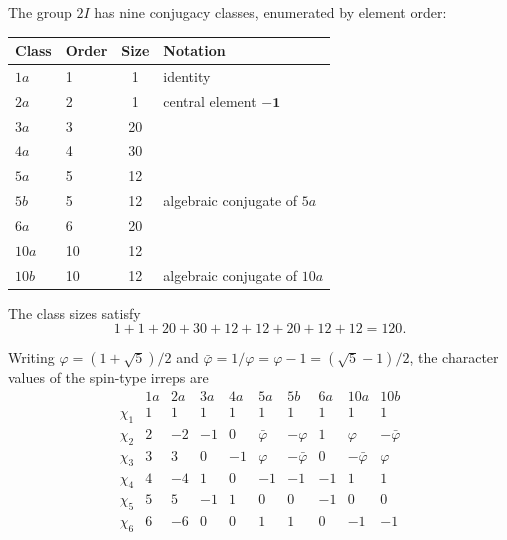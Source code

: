     The group $2I$ has nine conjugacy classes, enumerated by element order:
    \begin{center}
      \begin{tabular}{llcl}
        \hline
        Class & Order & Size & Notation                      \\
        \hline
        $1a$  & 1     & 1    & identity                      \\
        $2a$  & 2     & 1    & central element $-\mathbf{1}$ \\
        $3a$  & 3     & 20   &                               \\
        $4a$  & 4     & 30   &                               \\
        $5a$  & 5     & 12   &                               \\
        $5b$  & 5     & 12   & algebraic conjugate of $5a$   \\
        $6a$  & 6     & 20   &                               \\
        $10a$ & 10    & 12   &                               \\
        $10b$ & 10    & 12   & algebraic conjugate of $10a$  \\
        \hline
      \end{tabular}
    \end{center}
    The class sizes satisfy
    \[
      1+1+20+30+12+12+20+12+12 = 120.
    \]

    Writing $\varphi = (1+\sqrt{5})/2$ and
    $\bar\varphi = 1/\varphi = \varphi - 1 = (\sqrt{5}-1)/2$, the character
    values of the spin-type irreps are
    \begin{equation}
      \renewcommand{\arraystretch}{1.3}
      \begin{array}{l|rrrrrrrrr}
        & 1a & 2a & 3a & 4a & 5a & 5b & 6a & 10a & 10b \\
        \hline
        \chi_1 & 1 &  1 &  1 &  1 &  1 &  1 &  1 &  1 &  1 \\
        \chi_2 & 2 & -2 & -1 &  0 & \bar\varphi & -\varphi & 1 & \varphi & -\bar\varphi \\
        \chi_3 & 3 &  3 &  0 & -1 & \varphi & -\bar\varphi & 0 & -\bar\varphi & \varphi \\
        \chi_4 & 4 & -4 &  1 &  0 & -1 & -1 & -1 & 1 & 1 \\
        \chi_5 & 5 &  5 & -1 &  1 &  0 &  0 & -1 & 0 & 0 \\
        \chi_6 & 6 & -6 &  0 &  0 &  1 &  1 &  0 & -1 & -1
      \end{array}
      \label{eq:CT-2I}
    \end{equation}

